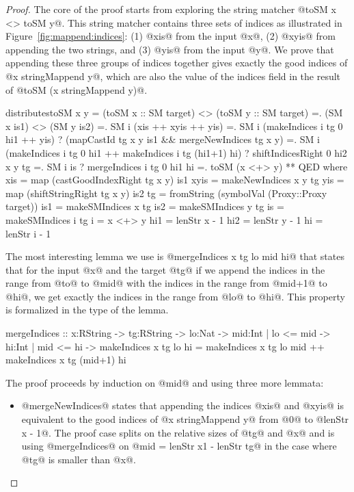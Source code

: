 \begin{proof}
The core of the proof starts from
exploring the string matcher @toSM x <> toSM y@.
%
This string matcher contains three sets of indices
as illustrated in Figure~\ref{fig:mappend:indices}:
(1) @xis@ from the input @x@,
(2) @xyis@ from appending the two strings, and
(3) @yis@ from the input @y@.
%
We prove that appending these three groups of indices together gives
exactly the good indices of @x stringMappend y@, which are also the
value of the indices field in the result of
%
@toSM (x stringMappend y)@.
\begin{code}
  distributestoSM x y
    =  (toSM x :: SM target) <> (toSM y :: SM target)
    =. (SM x is1) <> (SM y is2)
    =. SM i (xis ++ xyis ++ yis)
    =. SM i (makeIndices i tg 0 hi1 ++ yis)
       ? (mapCastId tg x y is1 && mergeNewIndices tg x y)
    =. SM i (makeIndices i tg 0 hi1 ++ makeIndices i tg (hi1+1) hi)
       ? shiftIndicesRight 0 hi2 x y tg
    =. SM i is
       ? mergeIndices i tg 0 hi1 hi
    =. toSM (x <+> y)
    ** QED
    where
      xis  = map (castGoodIndexRight tg x y) is1
      xyis = makeNewIndices x y tg
      yis  = map (shiftStringRight   tg x y) is2
      tg   = fromString (symbolVal (Proxy::Proxy target))
      is1  = makeSMIndices x tg
      is2  = makeSMIndices y tg 
      is   = makeSMIndices i tg
      i    = x <+> y
      hi1  = lenStr x - 1
      hi2  = lenStr y - 1
      hi   = lenStr i - 1
\end{code}
%
The most interesting lemma we use is
@mergeIndices x tg lo mid hi@
that states that for the input @x@ and the target @tg@
if we append the indices in the range  from @to@ to @mid@
with the indices in the range from @mid+1@ to @hi@,
we get exactly the indices in the range from @lo@ to @hi@.
%
This property is formalized in the type of the lemma.
\begin{code}
  mergeIndices
    :: x:RString -> tg:RString
    -> lo:Nat -> mid:{Int | lo <= mid} -> hi:{Int | mid <= hi}
    -> {   makeIndices x tg lo hi
       =  makeIndices x tg lo mid
       ++ makeIndices x tg (mid+1) hi}
\end{code}
%
The proof proceeds by induction on @mid@ and using three more lemmata:
\begin{itemize}
\item @mergeNewIndices@ states that appending the indices @xis@ and @xyis@
is equivalent to the good indices of @x stringMappend y@ from @0@ to @lenStr x - 1@.
%
The proof case splits on the relative sizes of @tg@ and @x@
and is using @mergeIndices@ on @mid = lenStr x1 - lenStr tg@
in the case where @tg@ is smaller than @x@.

\end{itemize}
\end{proof}
